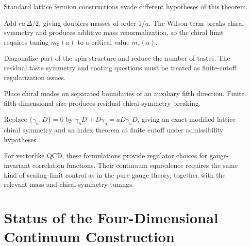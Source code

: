 Standard lattice fermion constructions evade different hypotheses of this
theorem.
\begin{description}[leftmargin=2.9em,style=nextline]
\item[Wilson fermions]
Add \(r a\,\Delta/2\), giving doublers masses of order \(1/a\).  The Wilson
term breaks chiral symmetry and produces additive mass renormalization, so the
chiral limit requires tuning \(m_0(a)\) to a critical value \(m_c(a)\).
\item[Staggered fermions]
Diagonalize part of the spin structure and reduce the number of tastes.  The
residual taste symmetry and rooting questions must be treated as finite-cutoff
regularization issues.
\item[Domain-wall fermions]
Place chiral modes on separated boundaries of an auxiliary fifth direction.
Finite fifth-dimensional size produces residual chiral-symmetry breaking.
\item[Overlap and Ginsparg--Wilson fermions]
Replace \(\{\gamma_5,D\}=0\) by
\(\gamma_5D+D\gamma_5=aD\gamma_5D\), giving an exact modified lattice chiral
symmetry and an index theorem at finite cutoff under admissibility hypotheses.
\end{description}
For vectorlike QCD, these formulations provide regulator choices for
gauge-invariant correlation functions.  Their continuum equivalence requires
the same kind of scaling-limit control as in the pure gauge theory, together
with the relevant mass and chiral-symmetry tunings.

\section{Status of the Four-Dimensional Continuum Construction}

